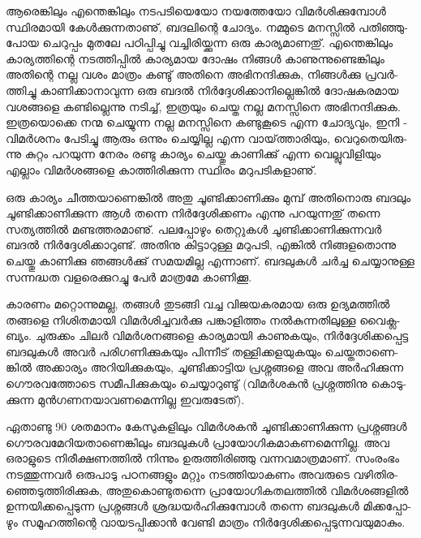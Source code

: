 
\vskip 2pt

ആ­രെ­ങ്കി­ലും എന്തെ­ങ്കി­ലും നട­പ­ടി­യെ­യോ നയ­ത്തേ­യോ വി­മര്‍­ശി­ക്കു­മ്പോള്‍ സ്ഥി­ര­മാ­യി കേള്‍­ക്കു­ന്ന­താ­ണു്, ബദ­ലി­ന്റെ ചോ­ദ്യം. 
നമ്മു­ടെ മന­സ്സില്‍ പതി­ഞ്ഞു­പോയ ചെ­റു­പ്പം മു­ത­ലേ പഠി­പ്പി­ച്ചു വച്ചി­രി­യ്ക്കു­ന്ന ഒരു കാ­ര്യ­മാ­ണ­തു്. എന്തെ­ങ്കി­ലും കാ­ര്യ­ത്തി­ന്റെ നട­ത്തി­പ്പില്‍ 
കാ­ര്യ­മായ ദോ­ഷം നി­ങ്ങള്‍ കാ­ണു­ന്നു­ണ്ടെ­ങ്കി­ലും അതി­ന്റെ നല്ല വശം മാ­ത്രം കണ്ടു് അതി­നെ അഭി­ന­ന്ദി­ക്കു­ക, നി­ങ്ങള്‍­ക്കു പ്ര­വര്‍­ത്തി­ച്ചു
 കാ­ണി­ക്കാ­നാ­വു­ന്ന ഒരു ബദല്‍ നിര്‍­ദ്ദേ­ശി­ക്കാ­നി­ല്ലെ­ങ്കില്‍ ദോ­ഷ­ക­ര­മായ വശ­ങ്ങ­ളെ കണ്ടി­ല്ലെ­ന്നു നടി­ച്ച്, ഇത്ര­യും ചെ­യ്ത നല്ല മന­സ്സി­നെ 
 അഭി­ന­ന്ദി­ക്കു­ക. ഇത്ര­യൊ­ക്കെ നന്മ ചെ­യ്യു­ന്ന നല്ല മന­സ്സി­നെ കണ്ടു­കൂ­ടെ എന്ന ചോ­ദ്യ­വും, ഇനി ­വി­മര്‍­ശ­നം­ പേ­ടി­ച്ചു ആരും ഒന്നും ചെ­യ്യി­ല്ല 
 എന്ന വാ­യ്‌­ത്താ­രി­യും, വെ­റു­തെ­യി­രു­ന്നു കു­റ്റം പറ­യു­ന്ന നേ­രം രണ്ടു കാ­ര്യം ചെ­യ്തു കാ­ണി­ക്കു് എന്ന വെ­ല്ലു­വി­ളി­യും എല്ലാം വി­മര്‍­ശ­ങ്ങ­ളെ 
 കാ­ത്തി­രി­ക്കു­ന്ന സ്ഥി­രം മറു­പ­ടി­ക­ളാ­ണു്.

ഒ­രു കാ­ര്യം ചീ­ത്ത­യാ­ണെ­ങ്കില്‍ അതു ചൂ­ണ്ടി­ക്കാ­ണി­ക്കും മു­മ്പ് അതി­നൊ­രു ബദ­ലും ചൂ­ണ്ടി­ക്കാ­ണി­ക്കു­ന്ന ആള്‍ തന്നെ നിര്‍­ദ്ദേ­ശി­ക്ക­ണം 
എന്നു പറ­യു­ന്ന­തു് തന്നെ സത്യ­ത്തില്‍ മണ്ട­ത്ത­ര­മാ­ണു്. പല­പ്പോ­ഴും തെ­റ്റു­കള്‍ ചൂ­ണ്ടി­ക്കാ­ണി­ക്കു­ന്ന­വര്‍ ബദല്‍ നിര്‍­ദ്ദേ­ശി­ക്കാ­റു­ണ്ട്. 
അതി­നു കി­ട്ടാ­റു­ള്ള മറു­പ­ടി, എങ്കില്‍ നി­ങ്ങ­ള­തൊ­ന്നു ചെ­യ്തു കാ­ണി­ക്കു ഞങ്ങള്‍­ക്കു് സമ­യ­മി­ല്ല എന്നാ­ണ്. ബദ­ലു­കള്‍ ചര്‍­ച്ച ചെ­യ്യാ­നു­ള്ള
 സന്ന­ദ്ധത വള­രെ­ക്കു­റ­ച്ചു പേര്‍ മാ­ത്ര­മേ കാ­ണി­ക്കൂ­.

­കാ­ര­ണം മറ്റൊ­ന്നു­മ­ല്ല, തങ്ങള്‍ തു­ട­ങ്ങി വച്ച വി­ജ­യ­ക­ര­മായ ഒരു ഉദ്യ­മ­ത്തില്‍ തങ്ങ­ളെ നി­ശി­ത­മാ­യി വി­മര്‍­ശി­ച്ച­വര്‍­ക്കു പങ്കാ­ളി­ത്തം
 നല്‍­കു­ന്ന­തി­ലു­ള്ള വൈ­ക്ല­ബ്യം. ചു­രു­ക്കം ചി­ലര്‍ വി­മര്‍­ശ­ന­ങ്ങ­ളെ കാ­ര്യ­മാ­യി കാ­ണു­ക­യും, നിര്‍­ദ്ദേ­ശി­ക്ക­പ്പെ­ട്ട ബദ­ലു­കള്‍ അവര്‍ 
 പരി­ഗ­ണി­ക്കു­ക­യും പി­ന്നീ­ട് തള്ളി­ക്ക­ള­യു­ക­യും ചെ­യ്ത­താ­ണെ­ങ്കില്‍ അക്കാ­ര്യം അറി­യി­ക്കു­ക­യും, ചൂ­ണ്ടി­ക്കാ­ട്ടിയ പ്ര­ശ്ന­ങ്ങ­ളെ അവ അര്‍­ഹി­ക്കു­ന്ന 
 ഗൌ­ര­വ­ത്തോ­ടെ സമീ­പി­ക്കു­ക­യും ചെ­യ്യാ­റു­ണ്ടു് (വി­മര്‍­ശ­കന്‍ പ്ര­ശ്ന­ത്തി­നു കൊ­ടു­ക്കു­ന്ന മുന്‍­ഗ­ണ­ന­യാ­വ­ണ­മെ­ന്നി­ല്ല ഇവ­രു­ടേ­ത്).

ഏ­താ­ണ്ടു 90 ശത­മാ­നം കേ­സു­ക­ളി­ലും വി­മര്‍­ശ­കന്‍ ചൂ­ണ്ടി­ക്കാ­ണി­ക്കു­ന്ന പ്ര­ശ്ന­ങ്ങള്‍ ഗൌ­ര­വ­മേ­റി­യ­താ­ണെ­ങ്കി­ലും ബദ­ലു­കള്‍ 
പ്രാ­യോ­ഗി­ക­മാ­ക­ണ­മെ­ന്നി­ല്ല. അവ ഒരാ­ളു­ടെ നി­രീ­ക്ഷ­ണ­ത്തില്‍ നി­ന്നും ഉരു­ത്തി­രി­ഞ്ഞു വന്ന­വ­മാ­ത്ര­മാ­ണ്. 
സം­രം­ഭം നട­ത്തു­ന്ന­വര്‍ ഒരു­പാ­ടു പഠ­ന­ങ്ങ­ളും മറ്റും നട­ത്തി­യാ­ക­ണം അവ­രു­ടെ വഴി­തി­ര­ഞ്ഞെ­ടു­ത്തി­രി­ക്കു­ക, അതു­കൊ­ണ്ടു­ത­ന്നെ
 പ്രാ­യോ­ഗി­ക­ത­ല­ത്തില്‍ വി­മര്‍­ശ­ങ്ങ­ളില്‍ ഉന്ന­യി­ക്ക­പ്പെ­ടു­ന്ന പ്ര­ശ്ന­ങ്ങള്‍ ശ്ര­ദ്ധ­യര്‍­ഹി­ക്കു­മ്പോള്‍ തന്നെ ബദ­ലു­കള്‍ മി­ക്ക­പ്പോ­ഴും 
 സമൂ­ഹ­ത്തി­ന്റെ വാ­യ­ട­പ്പി­ക്കാന്‍ വേ­ണ്ടി മാ­ത്രം നിര്‍­ദ്ദേ­ശി­ക്ക­പ്പെ­ടു­ന്ന­വ­യു­മാ­കും­.

